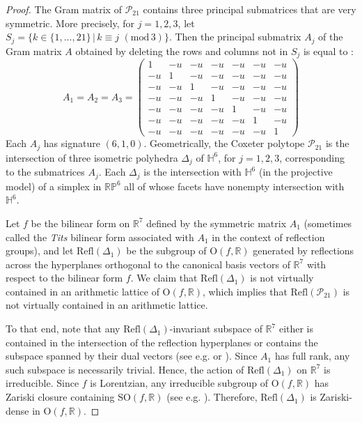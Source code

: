 \documentclass{amsart}
\theoremstyle{plain}
\theoremstyle{definition}
\theoremstyle{remark}
\numberwithin{equation}{section}
\newcommand{\rr}{\mathbb R}
\newcommand{\hh}{\mathbb H}
\begin{document}
\begin{proof}
    The Gram matrix of $\mathcal{P}_{21}$ contains three principal submatrices that are very symmetric. More precisely, for $j=1,2,3$, let $S_j = \{ k \in \{ 1, ..., 21 \}  \,|\, k \equiv j \,\, (\mathrm{mod} \, 3)\}$. Then the principal submatrix $A_j$ of the Gram matrix $A$ obtained by deleting the rows and columns not in $S_j$ is equal to :
    $$
    A_1 = A_2 = A_3 = \left(\begin{array}{rrrrrrr}
1 & -u & -u & -u & -u & -u & -u \\
-u & 1 & -u & -u & -u & -u & -u \\
-u & -u & 1 & -u & -u & -u & -u \\
-u & -u & -u & 1 & -u & -u & -u \\
-u & -u & -u & -u & 1 & -u & -u \\
-u & -u & -u & -u & -u & 1 & -u \\
-u & -u & -u & -u & -u & -u & 1
\end{array}\right)
$$
Each $A_j$ has signature $(6,1,0)$.
Geometrically, the Coxeter polytope $\mathcal{P}_{21}$ is the intersection of three isometric polyhedra $\Delta_j$ of $\hh^6$, for $j=1,2,3$, corresponding to the submatrices $A_j$. Each $\Delta_j$ is the intersection with $\hh^6$ (in the projective model) of a simplex in $\mathbb{RP}^6$ all of whose facets have nonempty intersection with $\mathbb{H}^6$.

Let $f$ be  the bilinear form on $\rr^7$ defined by the symmetric matrix $A_1$ (sometimes called the \emph{Tits} bilinear form associated with $A_1$ in the context of reflection groups), and
let $\mathrm{Refl} (\Delta_1)$ be the  subgroup of $\mathrm{O}(f,\rr)$ generated by reflections across the hyperplanes orthogonal to the canonical basis vectors of $\rr^7$ with respect to the bilinear form $f$.
We claim that $\mathrm{Refl} (\Delta_1)$ is not virtually contained in an arithmetic lattice of $\mathrm{O}(f,\rr)$, which  implies that  $\mathrm{Refl} (\mathcal{P}_{21})$ is not virtually contained in an arithmetic lattice.    

To that end, note that any $\mathrm{Refl} (\Delta_1)$-invariant subspace of $\rr^7$  either is contained in the intersection of the reflection hyperplanes or contains the subspace spanned by their dual vectors (see e.g. \cite[Proposition~19]{Vin71} or \cite[Proposition~3.23]{CG_CC}). Since $A_1$ has full rank, any such subspace is necessarily trivial.  Hence, the action of $\mathrm{Refl} (\Delta_1)$ on $\rr^7$ is irreducible. Since $f$ is Lorentzian, any irreducible subgroup of $\mathrm{O}(f,\rr)$ has Zariski closure containing $\mathrm{SO}(f,\rr)$ (see e.g. \cite[Proposition~1]{benoist_harpe}). Therefore, $\mathrm{Refl} (\Delta_1)$ is Zariski-dense in $\mathrm{O}(f,\rr)$.


\end{proof}
\end{document}
